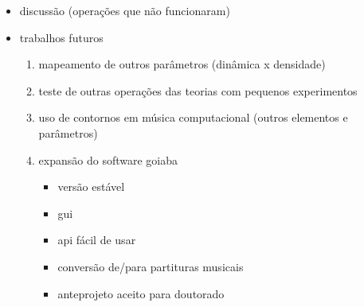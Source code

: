 \documentclass[12pt,a4paper]{article}
\begin{document}
\begin{itemize}
\item discussão (operações que não funcionaram)
\item trabalhos futuros
  \begin{enumerate}
  \item mapeamento de outros parâmetros (dinâmica x densidade)
  \item teste de outras operações das teorias com pequenos experimentos
  \item uso de contornos em música computacional (outros elementos e parâmetros)
  \item expansão do software goiaba
    \begin{itemize}
    \item versão estável
    \item gui
    \item api fácil de usar
    \item conversão de/para partituras musicais
    \item anteprojeto aceito para doutorado
    \end{itemize}
  \end{enumerate}
\end{itemize}
\end{document}
